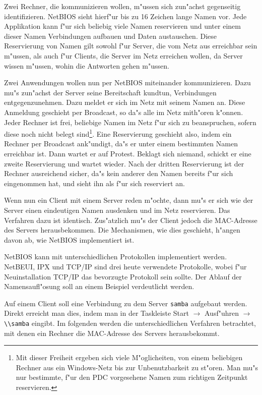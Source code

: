 \documentclass{scrartcl}
\newcommand{\nbname}{\texttt}
\begin{document}
Zwei Rechner, die kommunizieren wollen, m"ussen sich zun"achst gegenseitig
identifizieren. NetBIOS sieht hierf"ur bis zu 16 Zeichen lange Namen
vor.  Jede Applikation kann f"ur sich beliebig viele Namen reservieren
und unter einem dieser Namen Verbindungen aufbauen und Daten austauschen.
Diese Reservierung von Namen gilt sowohl f"ur Server, die vom Netz aus
erreichbar sein m"ussen, als auch f"ur Clients, die Server im Netz
erreichen wollen, da Server wissen m"ussen, wohin die Antworten
gehen m"ussen.

Zwei Anwendungen wollen nun per NetBIOS miteinander kommunizieren.
Dazu mu"s zun"achst der Server seine Bereitschaft kundtun,
Verbindungen entgegenzunehmen. Dazu meldet er sich im Netz mit seinem
Namen an. Diese Anmeldung geschieht per Broadcast, so da"s alle im
Netz mith"oren k"onnen. Jeder Rechner ist frei, beliebige Namen im
Netz f"ur sich zu beanspruchen, sofern diese noch nicht belegt
sind\footnote{Mit dieser Freiheit ergeben sich viele M"oglicheiten,
  von einem beliebigen Rechner aus ein Windows-Netz bis zur
  Unbenutzbarkeit zu st"oren. Man mu"s nur bestimmte, f"ur den PDC
  vorgesehene Namen zum richtigen Zeitpunkt reservieren.}. Eine
Reservierung geschieht also, indem ein Rechner per Broadcast
ank"undigt, da"s er unter einem bestimmten Namen erreichbar ist. Dann
wartet er auf Protest. Beklagt sich niemand, schickt er eine zweite
Reservierung und wartet wieder. Nach der dritten Reservierung ist der
Rechner ausreichend sicher, da"s kein anderer den Namen bereits f"ur
sich eingenommen hat, und sieht ihn als f"ur sich reserviert an.

Wenn nun ein Client mit einem Server reden m"ochte, dann mu"s er sich
wie der Server einen eindeutigen Namen ausdenken und im Netz
reservieren. Das Verfahren dazu ist identisch. Zus"atzlich mu"s der
Client jedoch die MAC-Adresse des Servers herausbekommen. Die
Mechanismen, wie dies geschieht, h"angen davon ab, wie NetBIOS
implementiert ist.

NetBIOS kann mit unterschiedlichen Protokollen implementiert werden.
NetBEUI, IPX und TCP/IP sind drei heute verwendete Protokolle, wobei
f"ur Neuinstallation TCP/IP das bevorzugte Protokoll sein sollte.
Der Ablauf der Namensaufl"osung soll an einem
Beispiel verdeutlicht werden.

Auf einem Client soll eine Verbindung zu dem Server \nbname{samba}
aufgebaut werden. Direkt erreicht man dies, indem man in der Taskleiste
Start $\rightarrow$ Ausf"uhren $\rightarrow$ \verb|\\samba| eingibt.
Im folgenden werden die unterschiedlichen Verfahren betrachtet, mit
denen ein Rechner die MAC-Adresse des Servers herausbekommt.
\end{document}
